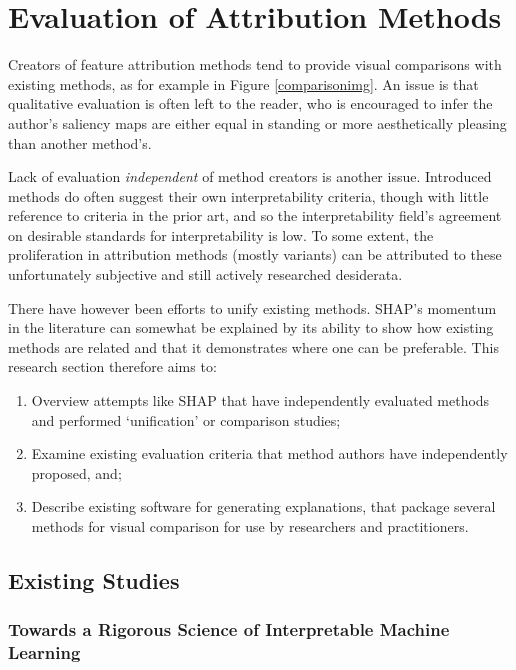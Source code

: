 \documentclass[main]{subfiles}
\begin{document}
\section{Evaluation of Attribution Methods}

Creators of feature attribution methods tend to provide visual comparisons with existing methods, as for example in Figure \ref{comparisonimg}. An issue is that qualitative evaluation is often left to the reader, who is encouraged to infer the author's saliency maps are either equal in standing or more aesthetically pleasing than another method's.

Lack of evaluation \textit{independent} of method creators is another issue. Introduced methods do often suggest their own interpretability criteria, though with little reference to criteria in the prior art, and so the interpretability field's agreement on desirable standards for interpretability is low. To some extent, the proliferation in attribution methods (mostly variants) can be attributed to these unfortunately subjective and still actively researched desiderata.

There have however been efforts to unify existing methods. SHAP's momentum in the literature can somewhat be explained by its ability to show how existing methods are related and that it demonstrates where one can be preferable. This research section therefore aims to:

\begin{enumerate}

\item Overview attempts like SHAP that have independently evaluated methods and performed `unification' or comparison studies;
\item Examine existing evaluation criteria that method authors have independently proposed, and;
\item Describe existing software for generating explanations, that package several methods for visual comparison for use by researchers and practitioners.

\end{enumerate}

\subsection{Existing Studies} \label{sec:existing_studies}
\subsubsection{Towards a Rigorous Science of Interpretable Machine Learning \cite{paradigms}}
\end{document}
